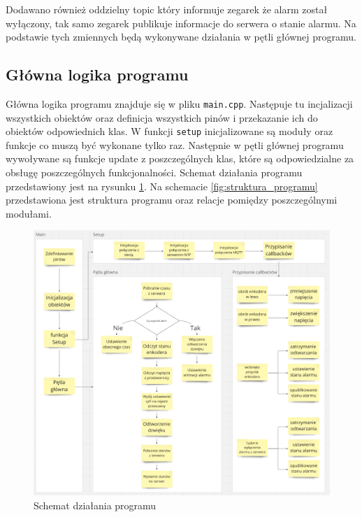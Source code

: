\documentclass[../main.tex]{subfiles}
\begin{document}
Dodawano również oddzielny topic który informuje zegarek że alarm został wyłączony, tak samo zegarek publikuje informacje do serwera o stanie alarmu.
Na podstawie tych zmiennych będą wykonywane działania w pętli głównej programu.

\subsection{Główna logika programu}
Główna logika programu znajduje się w pliku \texttt{main.cpp}. Następuje tu incjalizacji wszystkich obiektów oraz definicja wszystkich pinów i przekazanie ich do obiektów odpowiednich klas.
W funkcji \texttt{setup} inicjalizowane są moduły oraz funkcje co muszą być wykonane tylko raz.
Następnie w pętli głównej programu wywoływane są funkcje update z poszczególnych klas, które są odpowiedzialne za obsługę poszczególnych funkcjonalności.
Schemat działania programu przedstawiony jest na rysunku \ref{fig:schemat_dzialania}. Na schemacie \ref{fig:struktura_programu} przedstawiona jest struktura programu oraz
relacje pomiędzy poszczególnymi modułami.

\begin{figure}[H]
    \centering
    \includegraphics[width=1\textwidth]{program.png}
    \caption{Schemat działania programu}
    \label{fig:schemat_dzialania}
\end{figure}
\end{document}
